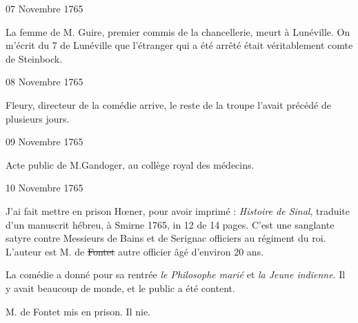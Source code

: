                     \begin{diary}{07 Novembre 1765}{}


                           La femme de M. Guire, premier
                           commis
                           de la chancellerie, meurt à Lunéville. On m'écrit du 7 de
                              Lunéville que l'étranger
                           qui a été arrêté était véritablement comte
                              de Steinbock. \bigskip


                     \end{diary}

                     \begin{diary}{08 Novembre 1765}{}


                           Fleury, directeur de la comédie arrive,
                           le reste de la troupe l'avait précédé de
                           plusieurs jours. \bigskip


                     \end{diary}

                     \begin{diary}{09 Novembre 1765}{}

                         Acte public de M.Gandoger, au collège
                              royal des médecins. \bigskip


                     \end{diary}

                     \begin{diary}{10 Novembre 1765}{}

                         J'ai fait mettre en prison Hœner, pour avoir
                           imprimé : \emph{Histoire de Sinal}, traduite
                           d'un
                           manuscrit hébreu, à Smirne
                           1765, in
                              12 de
                           14 pages. C'est une sanglante satyre contre
                           Messieurs
                           de Bains et de Serignac officiers au régiment
                           du roi. L'auteur est M. de
                                 \sout{Fontet} autre officier
                           âgé d'environ 20 ans. \bigskip


                         La comédie a donné pour sa rentrée
                              \emph{le
                              Philosophe marié} et \emph{la Jeune
                              indienne}.
                           Il y avait beaucoup de monde, et le public
                           a été content. \bigskip



                           M. de Fontet mis en prison. Il nie.
                        \bigskip


                     \end{diary}

